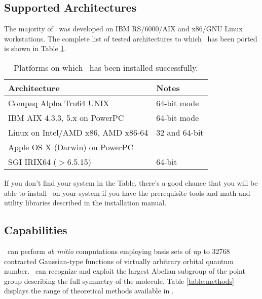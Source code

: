 \subsection{Supported Architectures}
The majority of \PSIthree\ was developed on IBM RS/6000/AIX
and x86/GNU Linux workstations. The complete list of
tested architectures to which \PSIthree\ has
been ported is shown in Table \ref{table:ports}.
\begin{table}[h]
\caption{Platforms on which \PSIthree\ has been installed successfully.}
\label{table:ports}
\begin{center}
\begin{tabular}{ll} \hline\hline
Architecture              &  Notes \\ \hline
Compaq Alpha Tru64 UNIX   & 64-bit mode \\
IBM AIX 4.3.3, 5.x on PowerPC & 64-bit mode \\
Linux on Intel/AMD x86, AMD x86-64  & 32 and 64-bit\\
Apple OS X (Darwin) on PowerPC & \\
SGI IRIX64 ($>$6.5.15)    & 64-bit \\ \hline\hline
\end{tabular}
\end{center}
\end{table}
If you don't find your system in the Table, there's a good chance
that you will be able to install \PSIthree\ on your system
if you have the prerequisite tools and math and utility libraries described 
in the installation manual.

\subsection{Capabilities}
\PSIthree\ can perform {\em ab initio} computations employing
basis sets of up to 32768 contracted Gaussian-type functions of
virtually arbitrary orbital quantum number.
\PSIthree\ can recognize and exploit the largest Abelian subgroup of the
point group describing the full symmetry of the molecule.
Table \ref{table:methods} displays the range of theoretical
methods available in \PSIthree .

